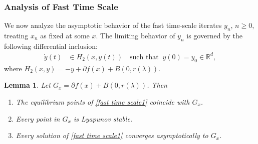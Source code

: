 \documentclass[9pt,journal,twoside,web]{ieeecolor}
\newtheorem{lemma}{Lemma}
\begin{document}
\subsubsection{Analysis of Fast Time Scale}
We now analyze the asymptotic behavior of the fast time-scale iterates $y_n$, $n\geq 0$, treating $x_n$ as fixed at some $x$. The limiting behavior of $y_n$ is governed by the following differential inclusion:
\begin{equation}
     \begin{split}
        \Dot{y}(t) & \in H_2(x,y(t)) \quad 
         \text{such that} \; \; y(0)  = y_0 \in \mathbb{R}^{d}, 
        \end{split}
        \label{fast time scale1}
\end{equation}
where $  H_2(x,y) = -y  + \partial f(x) + B(0,r(\lambda))$. 
\begin{lemma}
Let $G_x = \partial f(x) + B (0,r(\lambda))$. Then 
\begin{enumerate}
    \item[i.] The equilibrium points of \eqref{fast time scale1} coincide with $G_x$.
    \item[ii.] Every point in $G_x$ is Lyapunov stable.
    \item[iii] Every solution of \eqref{fast time scale1} converges asymptotically to $G_x$.
\end{enumerate}
\label{lema fast time scale}
\end{lemma}
\end{document}
